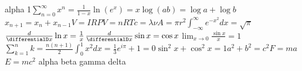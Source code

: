 \documentclass{article}
\begin{document}
alpha 1$\sum_{n=0}^{\infty}x^{n}=\frac{1}{1-x}$$\ln\left(e^{x}\right)=x$$\log\left(ab\right)=\log a+\log b$$x_{n+1}=x_{n}+x_{n-1}$$V=IR$$PV=nRT$$c=\lambda\nu$$A=\pi r^2$$\int_{-\infty}^{\infty}e^{-x^2}dx=\sqrt{\pi}$$\frac{d}{\differentialD x}\ln x=\frac{1}{x}$$\frac{d}{\differentialD x}\sin x=\cos x$$\lim_{x\to0}\frac{\sin x}{x}=1$$\sum_{k=1}^{n}k=\frac{n\left(n+1\right)}{2}$$\int_0^1x^2dx=\frac13$$e^{i\pi}+1=0$$\sin^2x+\cos^2x=1$$a^2+b^2=c^2$$F=ma$$E=mc^2$
alpha
beta
gamma
delta
\end{document}
